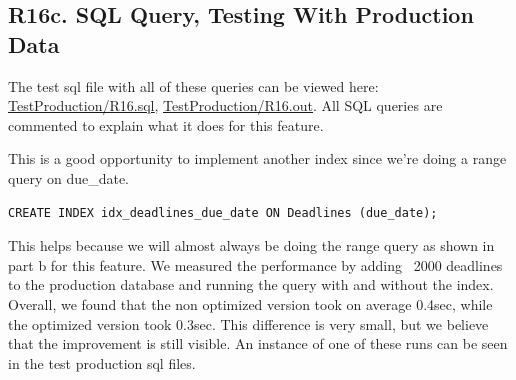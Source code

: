 \documentclass[12pt, a4paper]{article}
\begin{document}
\subsection*{R16c. SQL Query, Testing With Production Data}
The test sql file with all of these queries can be viewed here: \underline{\href{https://github.com/Kggupta/DegreeMap/tree/main/Database/Queries/TestProduction}{TestProduction/R16.sql}}, \underline{\href{https://github.com/Kggupta/DegreeMap/tree/main/Database/Queries/TestProduction}{TestProduction/R16.out}}. All SQL queries are commented to explain what it does for this feature.

This is a good opportunity to implement another index since we're doing a range query on due\_date.

\begin{verbatim}
CREATE INDEX idx_deadlines_due_date ON Deadlines (due_date);
\end{verbatim}
This helps because we will almost always be doing the range query as shown in part b for this feature. We measured the performance by adding ~2000 deadlines to the production database and running the query with and without the index. Overall, we found that the non optimized version took on average 0.4sec, while the optimized version took 0.3sec. This difference is very small, but we believe that the improvement is still visible. An instance of one of these runs can be seen in the test production sql files.
\end{document}
